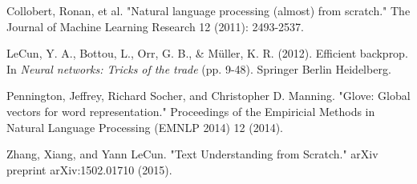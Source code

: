 \documentclass{article}
\begin{document}
Collobert, Ronan, et al. "Natural language processing (almost) from scratch." The Journal of Machine Learning Research 12 (2011): 2493-2537.

LeCun, Y. A., Bottou, L., Orr, G. B., \& Müller, K. R. (2012). Efficient backprop. In \emph{Neural networks: Tricks of the trade} (pp. 9-48). Springer Berlin Heidelberg.

Pennington, Jeffrey, Richard Socher, and Christopher D. Manning. "Glove: Global vectors for word representation." Proceedings of the Empiricial Methods in Natural Language Processing (EMNLP 2014) 12 (2014).

Zhang, Xiang, and Yann LeCun. "Text Understanding from Scratch." arXiv preprint arXiv:1502.01710 (2015).
\end{document}

